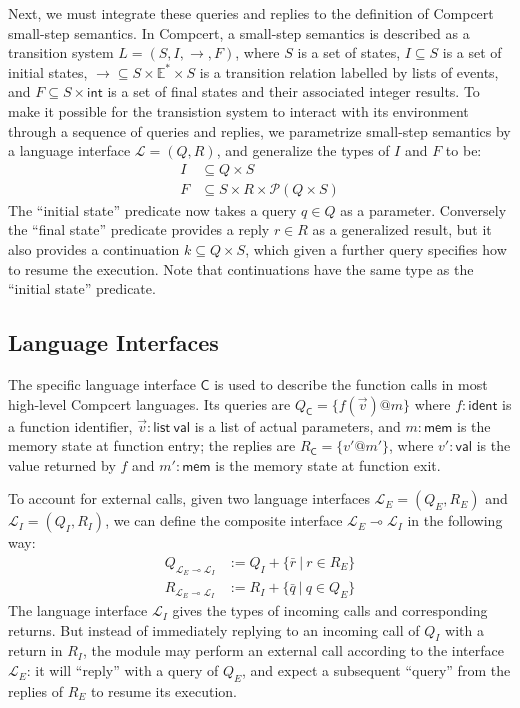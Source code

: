 \documentclass[11pt]{article}
\newcommand{\kw}[1]{{\mathsf{#1}}}
\begin{document}
Next, we must integrate these queries and replies to
the definition of Compcert small-step semantics.
In Compcert, a small-step semantics is described as
a transition system $L = (S, I, \rightarrow, F)$, where
$S$ is a set of states,
$I \subseteq S$ is a set of initial states,
${\rightarrow} \subseteq S \times \mathbb{E}^* \times S$
is a transition relation labelled by lists of events, and
$F \subseteq S \times \kw{int}$ is a set of final states
and their associated integer results.
To make it possible for the transistion system to
interact with its environment
through a sequence of queries and replies,
we parametrize small-step semantics by
a language interface $\mathcal{L} = (Q, R)$,
and generalize the types of $I$ and $F$ to be:
\begin{align*}
  I &\subseteq Q \times S \\
  F &\subseteq S \times R \times \mathcal{P}(Q \times S)
\end{align*}
The ``initial state'' predicate
now takes a query $q \in Q$ as a parameter.
Conversely the ``final state'' predicate
provides a reply $r \in R$ as a generalized result,
but it also provides a continuation $k \subseteq Q \times S$,
which given a further query specifies how to resume the execution.
Note that continuations
have the same type as the ``initial state'' predicate.

\subsection{Language Interfaces}

The specific language interface $\kw{C}$
is used to describe the function calls in most high-level Compcert languages.
Its queries are $Q_\kw{C} = \{ f(\vec{v})@m \}$
where $f : \kw{ident}$ is a function identifier,
$\vec{v} : \kw{list}\ \kw{val}$ is a list of actual parameters, and
$m : \kw{mem}$ is the memory state at function entry;
the replies are $R_\kw{C} = \{ v'@m' \}$,
where $v' : \kw{val}$ is the value returned by $f$ and
$m' : \kw{mem}$ is the memory state at function exit.

To account for external calls,
given two language interfaces
$\mathcal{L}_E = (Q_E, R_E)$ and
$\mathcal{L}_I = (Q_I, R_I)$,
we can define the composite interface
$\mathcal{L}_E \multimap \mathcal{L}_I$
in the following way:
\begin{align*}
  Q_{\mathcal{L}_E \multimap \mathcal{L}_I} &:=
    Q_I + \{ \bar{r} \:|\: r \in R_E \} \\
  R_{\mathcal{L}_E \multimap \mathcal{L}_I} &:=
    R_I + \{ \bar{q} \:|\: q \in Q_E \}
\end{align*}
The language interface $\mathcal{L}_I$
gives the types of incoming calls and corresponding returns.
But instead of immediately replying to an incoming call of $Q_I$
with a return in $R_I$,
the module may perform an external call
according to the interface $\mathcal{L}_E$:
it will ``reply'' with a query of $Q_E$,
and expect a subsequent ``query'' from the replies of $R_E$
to resume its execution.
\end{document}

